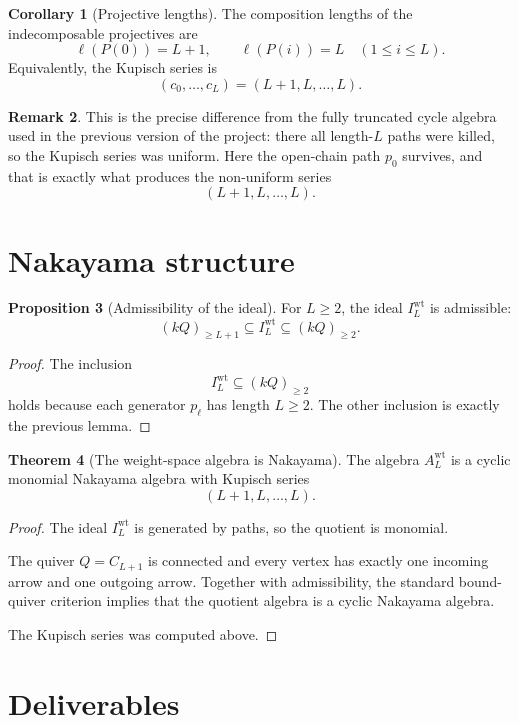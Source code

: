 \documentclass{article}
\theoremstyle{definition}
\newtheorem{theorem}{Theorem}[section]
\newtheorem{proposition}[theorem]{Proposition}
\newtheorem{corollary}[theorem]{Corollary}
\newtheorem{remark}[theorem]{Remark}
\begin{document}
\begin{corollary}[Projective lengths]
The composition lengths of the indecomposable projectives are
\[
\ell(P(0))=L+1,
\qquad
\ell(P(i))=L
\quad
(1\le i\le L).
\]
Equivalently, the Kupisch series is
\[
(c_0,\dots,c_L)=(L+1,L,\dots,L).
\]
\end{corollary}

\begin{remark}
This is the precise difference from the fully truncated cycle algebra used in
the previous version of the project: there all length-$L$ paths were killed, so
the Kupisch series was uniform. Here the open-chain path $p_0$ survives, and
that is exactly what produces the non-uniform series
\[
(L+1,L,\dots,L).
\]
\end{remark}

\section{Nakayama structure}

\begin{proposition}[Admissibility of the ideal]
For $L\ge 2$, the ideal $I_L^{\mathrm{wt}}$ is admissible:
\[
(kQ)_{\ge L+1}\subseteq I_L^{\mathrm{wt}}\subseteq (kQ)_{\ge 2}.
\]
\end{proposition}

\begin{proof}
The inclusion
\[
I_L^{\mathrm{wt}}\subseteq (kQ)_{\ge 2}
\]
holds because each generator $p_\ell$ has length $L\ge 2$.
The other inclusion is exactly the previous lemma.
\end{proof}

\begin{theorem}[The weight-space algebra is Nakayama]
The algebra $A_L^{\mathrm{wt}}$ is a cyclic monomial Nakayama algebra with
Kupisch series
\[
(L+1,L,\dots,L).
\]
\end{theorem}

\begin{proof}
The ideal $I_L^{\mathrm{wt}}$ is generated by paths, so the quotient is
monomial.

The quiver $Q=C_{L+1}$ is connected and every vertex has exactly one incoming
arrow and one outgoing arrow. Together with admissibility, the standard
bound-quiver criterion implies that the quotient algebra is a cyclic Nakayama
algebra.

The Kupisch series was computed above.
\end{proof}

\section{Deliverables}
\end{document}
